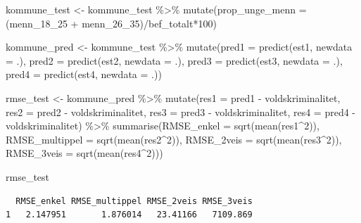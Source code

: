 \documentclass[
  letterpaper,
  DIV=11,
  numbers=noendperiod]{scrreprt}
\newenvironment{Shaded}{\begin{snugshade}}{\end{snugshade}}
\newcommand{\AttributeTok}[1]{\textcolor[rgb]{0.40,0.45,0.13}{#1}}
\newcommand{\DecValTok}[1]{\textcolor[rgb]{0.68,0.00,0.00}{#1}}
\newcommand{\FunctionTok}[1]{\textcolor[rgb]{0.28,0.35,0.67}{#1}}
\newcommand{\NormalTok}[1]{\textcolor[rgb]{0.00,0.23,0.31}{#1}}
\newcommand{\OtherTok}[1]{\textcolor[rgb]{0.00,0.23,0.31}{#1}}
\newcommand{\SpecialCharTok}[1]{\textcolor[rgb]{0.37,0.37,0.37}{#1}}
\begin{document}
\begin{Shaded}
\begin{Highlighting}[]
\NormalTok{kommune\_test }\OtherTok{\textless{}{-}}\NormalTok{ kommune\_test }\SpecialCharTok{\%\textgreater{}\%}
  \FunctionTok{mutate}\NormalTok{(}\AttributeTok{prop\_unge\_menn =}\NormalTok{ (menn\_18\_25 }\SpecialCharTok{+}\NormalTok{ menn\_26\_35)}\SpecialCharTok{/}\NormalTok{bef\_totalt}\SpecialCharTok{*}\DecValTok{100}\NormalTok{)}

\NormalTok{kommune\_pred }\OtherTok{\textless{}{-}}\NormalTok{ kommune\_test }\SpecialCharTok{\%\textgreater{}\%}
  \FunctionTok{mutate}\NormalTok{(}\AttributeTok{pred1 =} \FunctionTok{predict}\NormalTok{(est1, }\AttributeTok{newdata =}\NormalTok{ .),}
         \AttributeTok{pred2 =} \FunctionTok{predict}\NormalTok{(est2, }\AttributeTok{newdata =}\NormalTok{ .),}
         \AttributeTok{pred3 =} \FunctionTok{predict}\NormalTok{(est3, }\AttributeTok{newdata =}\NormalTok{ .),}
         \AttributeTok{pred4 =} \FunctionTok{predict}\NormalTok{(est4, }\AttributeTok{newdata =}\NormalTok{ .))}

\NormalTok{rmse\_test }\OtherTok{\textless{}{-}}\NormalTok{ kommune\_pred }\SpecialCharTok{\%\textgreater{}\%}
  \FunctionTok{mutate}\NormalTok{(}\AttributeTok{res1 =}\NormalTok{ pred1 }\SpecialCharTok{{-}}\NormalTok{ voldskriminalitet,}
         \AttributeTok{res2 =}\NormalTok{ pred2 }\SpecialCharTok{{-}}\NormalTok{ voldskriminalitet,}
         \AttributeTok{res3 =}\NormalTok{ pred3 }\SpecialCharTok{{-}}\NormalTok{ voldskriminalitet,}
         \AttributeTok{res4 =}\NormalTok{ pred4 }\SpecialCharTok{{-}}\NormalTok{ voldskriminalitet) }\SpecialCharTok{\%\textgreater{}\%}
  \FunctionTok{summarise}\NormalTok{(}\AttributeTok{RMSE\_enkel =} \FunctionTok{sqrt}\NormalTok{(}\FunctionTok{mean}\NormalTok{(res1}\SpecialCharTok{\^{}}\DecValTok{2}\NormalTok{)),}
            \AttributeTok{RMSE\_multippel =} \FunctionTok{sqrt}\NormalTok{(}\FunctionTok{mean}\NormalTok{(res2}\SpecialCharTok{\^{}}\DecValTok{2}\NormalTok{)),}
            \AttributeTok{RMSE\_2veis =} \FunctionTok{sqrt}\NormalTok{(}\FunctionTok{mean}\NormalTok{(res3}\SpecialCharTok{\^{}}\DecValTok{2}\NormalTok{)),}
            \AttributeTok{RMSE\_3veis =} \FunctionTok{sqrt}\NormalTok{(}\FunctionTok{mean}\NormalTok{(res4}\SpecialCharTok{\^{}}\DecValTok{2}\NormalTok{)))}

\NormalTok{rmse\_test}
\end{Highlighting}
\end{Shaded}

\begin{verbatim}
  RMSE_enkel RMSE_multippel RMSE_2veis RMSE_3veis
1   2.147951       1.876014   23.41166   7109.869
\end{verbatim}
\end{document}
